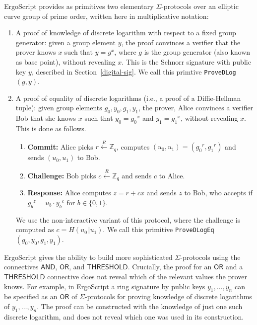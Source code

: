 \documentclass[11pt]{article}
\newcommand{\authnote}[2]{\marginpar{\parbox{\marginparwidth}{\tiny %
  \textsf{#1 {\textcolor{blue}{notes: #2}}}}}%
  \textcolor{blue}{\textbf{\dag}}}
\newcommand{\authnote}[2]{
  \textsf{#1 \textcolor{blue}{: #2}}}
\newcommand{\authnote}[2]{}
\newcommand{\snote}[1]{{\authnote{\textcolor{yellow}{Scalahub notes}}{#1}}}
\newcommand{\langname}{ErgoScript\xspace}
\newcommand{\andnode}{\ensuremath{\mathsf{AND}}}
\newcommand{\ornode}{\ensuremath{\mathsf{OR}}}
\newcommand{\tnode}{\ensuremath{\mathsf{THRESHOLD}}}
\begin{document}
\langname provides as primitives two elementary $\Sigma$-protocols over an elliptic curve group of prime order, written here in multiplicative notation:
\begin{enumerate}
\item A proof of knowledge of discrete logarithm with respect to a fixed group generator: given a group element $y$, the proof convinces a verifier that the prover knows $x$ such that $y=g^x$, where $g$ is the group generator (also known as base point), without revealing $x$. This is the Schnorr signature with public key $y$, described in Section~\ref{digital-sig}.
We call this primtive \texttt{ProveDLog}$(g, y)$.
 
\snote{What is the exact input to the hash function? (what forms the message?)}

\item A proof of equality of discrete logarithms (i.e., a proof of a Diffie-Hellman tuple): given group elements $g_0, y_0, g_1, y_1$, the prover, Alice convinces a verifier Bob that she knows $x$ such that $y_0={g_0}^x$ and $y_1={g_1}^x$, without revealing $x$. This is done as follows. 
\begin{enumerate}
	\item \textbf{Commit:} Alice picks $r \stackrel{R}{\leftarrow} \mathbb{Z}_q$, computes $(u_0, u_1) = ({g_0}^r, {g_1}^r)$ and sends $(u_0, u_1)$ to Bob.
	\item \textbf{Challenge:} Bob picks $c \stackrel{R}{\leftarrow} \mathbb{Z}_q$ and sends $c$ to Alice.
	\item \textbf{Response:} Alice computes $z = r + cx$ and sends $z$ to Bob, who accepts if ${g_b}^z = {u_b}\cdot {y_b}^c$ for $b \in \{0,1\}$.
\end{enumerate}

We use the non-interactive variant of this protocol, where the challenge is computed as $c = H(u_0 \Vert u_1)$. We call this primitive \texttt{ProveDLogEq}$(g_0, y_0, g_1, y_1)$.%

\snote{What is the exact input to the hash function?}

\end{enumerate}

\langname gives the ability to build more sophisticated $\Sigma$-protocols using the connectives $\andnode$, $\ornode$, and $\tnode$. 
Crucially, the proof for an $\ornode$ and a $\tnode$ connective does not reveal which of the relevant values the prover knows. For example, in \langname a ring signature by public keys $y_1, \dots, y_n$ can be specified as an $\ornode$ of $\Sigma$-protocols for proving knowledge of discrete logarithms of $y_1, \dots, y_n$. The proof can be constructed with the knowledge of just one such discrete logarithm, and does not reveal which one was used in its construction. 
\end{document}

